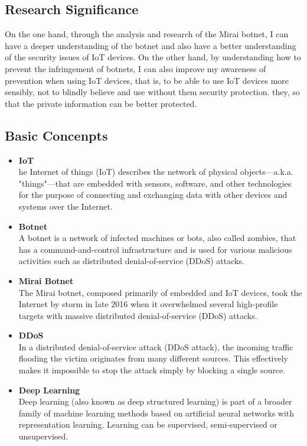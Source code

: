 \documentclass[conference]{IEEEtran}
\begin{document}
\subsection{\textbf{Research Significance}}
On the one hand, through the analysis and research of the Mirai botnet, I can have a deeper understanding of the botnet and also have a better understanding of the security issues of IoT devices. On the other hand, by understanding how to prevent the infringement of botnets, I can also improve my awareness of prevention when using IoT devices, that is, to be able to use IoT devices more sensibly, not to blindly believe and use without them security protection. they, so that the private information can be better protected.
\subsection{\textbf{Basic Concenpts}}
\begin{itemize}
\item \textbf{IoT}\\
he Internet of things (IoT) describes the network of physical objects—a.k.a. "things"—that are embedded with sensors, software, and other technologies for the purpose of connecting and exchanging data with other devices and systems over the Internet.\cite{b16}
\item \textbf{Botnet}\\
A botnet is a
network of infected machines or bots, also called zombies,
that has a command-and-control infrastructure
and is used for various malicious activities such as distributed
denial-of-service (DDoS) attacks.\cite{b10}
\item  \textbf{Mirai Botnet}\\
  The Mirai botnet, composed primarily of embedded
and IoT devices, took the Internet by storm in late 2016
when it overwhelmed several high-profile targets with
massive distributed denial-of-service (DDoS) attacks.\cite{b1}
\item  \textbf{DDoS}\\
In a distributed denial-of-service attack (DDoS attack), the incoming traffic flooding the victim originates from many different sources. This effectively makes it impossible to stop the attack simply by blocking a single source.\cite{b14}
\item  \textbf{Deep Learning}\\
Deep learning (also known as deep structured learning) is part of a broader family of machine learning methods based on artificial neural networks with representation learning. Learning can be supervised, semi-supervised or unsupervised.\cite{b15}
\end{itemize}
\end{document}
